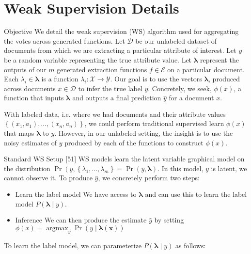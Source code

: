 \documentclass[10pt]{article}
\begin{document}
\section{Weak Supervision Details}
Objective We detail the weak supervision (WS) algorithm used for aggregating the votes across generated functions. Let $\mathcal{D}$ be our unlabeled dataset of documents from which we are extracting a particular attribute of interest. Let $y$ be a random variable representing the true attribute value. Let $\boldsymbol{\lambda}$ represent the outputs of our $m$ generated extraction functions $f \in \mathcal{E}$ on a particular document. Each $\lambda_{i} \in \boldsymbol{\lambda}$ is a function $\lambda_{i}: \mathcal{X} \rightarrow \mathcal{Y}$. Our goal is to use the vectors $\boldsymbol{\lambda}$, produced across documents $x \in \mathcal{D}$ to infer the true label $y$. Concretely, we seek, $\phi(x)$, a function that inputs $\boldsymbol{\lambda}$ and outputs a final prediction $\hat{y}$ for a document $x$.

With labeled data, i.e. where we had documents and their attribute values $\left\{\left(x_{1}, a_{1}\right), \ldots,\left(x_{n}, a_{n}\right)\right\}$, we could perform traditional supervised learn $\phi(x)$ that maps $\boldsymbol{\lambda}$ to $y$. However, in our unlabeled setting, the insight is to use the noisy estimates of $y$ produced by each of the functions to construct $\phi(x)$.

Standard WS Setup [51] WS models learn the latent variable graphical model on the distribution $\operatorname{Pr}\left(y,\left\{\lambda_{1}, \ldots, \lambda_{m}\right\}=\operatorname{Pr}(y, \boldsymbol{\lambda})\right.$. In this model, $y$ is latent, we cannot observe it. To produce $\hat{y}$, we concretely perform two steps:

\begin{itemize}
  \item Learn the label model We have access to $\boldsymbol{\lambda}$ and can use this to learn the label model $P(\boldsymbol{\lambda} \mid y)$.

  \item Inference We can then produce the estimate $\hat{y}$ by setting $\phi(x)=\operatorname{argmax}_{y} \operatorname{Pr}(y \mid \boldsymbol{\lambda}(\boldsymbol{x}))$

\end{itemize}

To learn the label model, we can parameterize $P(\boldsymbol{\lambda} \mid y)$ as follows:
\end{document}
